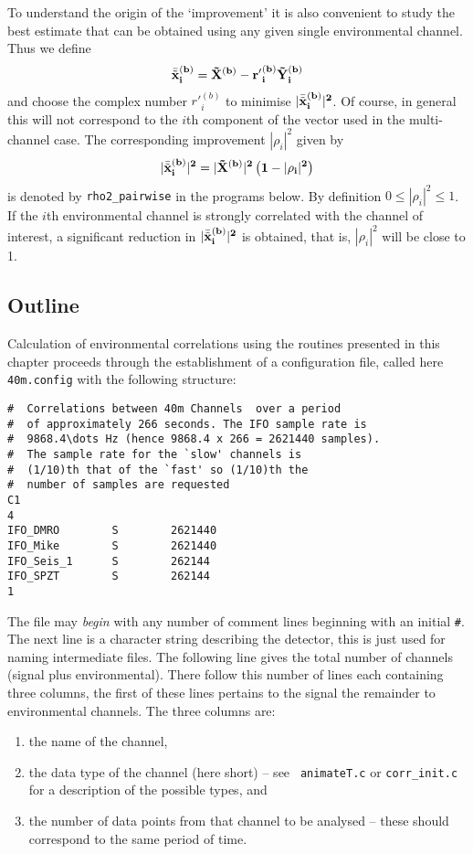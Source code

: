 To understand the origin of the `improvement' it is also convenient to
study the best estimate that can be obtained using any given single
environmental channel.  Thus we define 
\begin{equation}
\bar {\tilde {\bf x}}^{(b)}_i
=  {\tilde {\bf X}}^{(b)} - 
{r'}^{(b)}_i {\tilde {\bf Y}_i}^{(b)}
\end{equation}
and choose the complex number ${r'}^{(b)}_i$ to  minimise 
$|\bar {\tilde {\bf x}}^{(b)}_i|^2$.  Of course, in general this
will not correspond to the $i$th component of the vector 
used in the multi-channel case.
The corresponding improvement $|\rho_i|^2$ given by 
\begin{equation}
|\bar {\tilde {\bf x}}^{(b)}_i|^2 = |{\tilde {\bf X}}^{(b)}|^2 
      \left( 1 - |\rho_i|^2 \right)
\end{equation}
is denoted by {\tt rho2\_pairwise} in the programs below.
By definition $0 \leq |\rho_i|^2 \leq 1$.
If the $i$th  environmental channel is  strongly correlated
with the channel of interest, a significant reduction in  
$|\bar {\tilde {\bf x}}^{(b)}_i|^2$ is
obtained, that is, $|\rho_i|^2$ will be close to 1.
 



\clearpage
\subsection{Outline}

Calculation of environmental correlations using the routines presented
in this chapter proceeds through the 
establishment of a configuration file, called here {\tt 40m.config} 
with the following structure:

\begin{verbatim}
#  Correlations between 40m Channels  over a period
#  of approximately 266 seconds. The IFO sample rate is 
#  9868.4\dots Hz (hence 9868.4 x 266 = 2621440 samples).
#  The sample rate for the `slow' channels is
#  (1/10)th that of the `fast' so (1/10)th the
#  number of samples are requested 
C1
4
IFO_DMRO        S        2621440
IFO_Mike        S        2621440
IFO_Seis_1      S        262144
IFO_SPZT        S        262144
1
\end{verbatim}

  The file may {\it begin} with any number of comment lines beginning
with an initial {\tt \#}.  The next line is a character string 
describing the detector, this is just used for naming intermediate files.
The following line gives the total number of channels (signal plus
environmental).  There follow this number of lines each containing
three columns, the first of these lines pertains to the signal 
the remainder to environmental channels.  The three columns are:
\begin{enumerate}
\item the name of the channel,
\item the data type of the channel (here short) -- see {\tt
animateT.c} or {\tt corr\_init.c} for a description of the possible types,
and 
\item the number of data points from that channel to be analysed --
these should correspond to the same period of time.
\end{enumerate}


